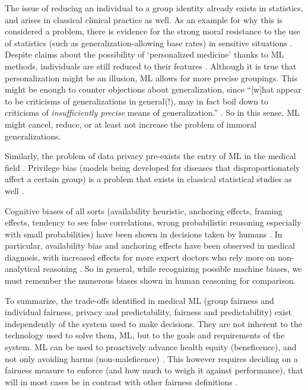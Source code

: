     The issue of reducing an individual to a group identity already exists in statistics, and arises in classical clinical practice as well.
    As an example for why this is considered a problem, there is evidence for the strong moral resistance to the use of statistics (such as generalization-allowing base rates) in sensitive situations \cite{Tetlock2003}.
    Despite claims about the possibility of `personalized medicine' thanks to ML methods, individuals are still reduced to their features \cite{Dijkstra2020, Binns2018}.
    Although it is true that personalization might be an illusion, ML allows for more precise groupings.
    This might be enough to counter objections about generalization, since ``[w]hat appear to be criticisms of generalizations in general(!), may in fact boil down to criticisms of \emph{insufficiently precise} means of generalization.'' \cite[p.~5]{Binns2018}.
    So in this sense, ML might cancel, reduce, or at least not increase the problem of immoral generalizations.

    Similarly, the problem of data privacy pre-exists the entry of ML in the medical field \cite{Dijkstra2020}.
    Privilege bias (models being developed for diseases that disproportionately affect a certain group\cite{Rajkomar2018}) is a problem that exists in classical statistical studies as well \cite{Jackson2019}.

    Cognitive biases of all sorts (availability heuristic, anchoring effects, framing effects, tendency to see false correlations, wrong probabilistic reasoning especially with small probabilities) have been shown in decisions taken by humans \cite{Zerilli2019}.
    In particular, availability bias and anchoring effects have been observed in medical diagnosis, with increased effects for more expert doctors who rely more on non-analytical reasoning \cite{Mamede2010}.
    So in general, while recognizing possible machine biases, we must remember the numerous biases shown in human reasoning for comparison.

    To summarize, the trade-offs identified in medical ML (group fairness and individual fairness, privacy and predictability, fairness and predictability) exist independently of the system used to make decisions.
    They are not inherent to the technology used to solve them, ML, but to the goals and requirements of the system.
    ML can be used to proactively advance health equity (beneficence), and not only avoiding harms (non-maleficence) \cite{Rajkomar2018, Mccradden2020}.
    This however requires deciding on a fairness measure to enforce (and how much to weigh it against performance), that will in most cases be in contrast with other fairness definitions \cite{Zerilli2019}.



